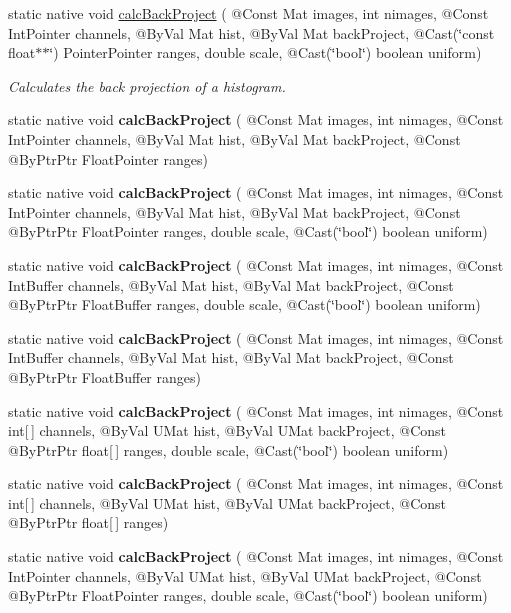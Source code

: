 \begin{DoxyCompactItemize}
\item 
static native void \hyperlink{group__imgproc__hist_gaf0312cafdf92e7baeb662d460281307e}{calc\+Back\+Project} ( @Const Mat images, int nimages, @Const Int\+Pointer channels, @By\+Val Mat hist, @By\+Val Mat back\+Project, @Cast(\char`\"{}const float$\ast$$\ast$\char`\"{}) Pointer\+Pointer ranges, double scale, @Cast(\char`\"{}bool\char`\"{}) boolean uniform)
\begin{DoxyCompactList}\small\item\em Calculates the back projection of a histogram. \end{DoxyCompactList}\item 
static native void {\bfseries calc\+Back\+Project} ( @Const Mat images, int nimages, @Const Int\+Pointer channels, @By\+Val Mat hist, @By\+Val Mat back\+Project, @Const @By\+Ptr\+Ptr Float\+Pointer ranges)
\item 
static native void {\bfseries calc\+Back\+Project} ( @Const Mat images, int nimages, @Const Int\+Pointer channels, @By\+Val Mat hist, @By\+Val Mat back\+Project, @Const @By\+Ptr\+Ptr Float\+Pointer ranges, double scale, @Cast(\char`\"{}bool\char`\"{}) boolean uniform)
\item 
static native void {\bfseries calc\+Back\+Project} ( @Const Mat images, int nimages, @Const Int\+Buffer channels, @By\+Val Mat hist, @By\+Val Mat back\+Project, @Const @By\+Ptr\+Ptr Float\+Buffer ranges, double scale, @Cast(\char`\"{}bool\char`\"{}) boolean uniform)
\item 
static native void {\bfseries calc\+Back\+Project} ( @Const Mat images, int nimages, @Const Int\+Buffer channels, @By\+Val Mat hist, @By\+Val Mat back\+Project, @Const @By\+Ptr\+Ptr Float\+Buffer ranges)
\item 
static native void {\bfseries calc\+Back\+Project} ( @Const Mat images, int nimages, @Const int\mbox{[}$\,$\mbox{]} channels, @By\+Val U\+Mat hist, @By\+Val U\+Mat back\+Project, @Const @By\+Ptr\+Ptr float\mbox{[}$\,$\mbox{]} ranges, double scale, @Cast(\char`\"{}bool\char`\"{}) boolean uniform)
\item 
static native void {\bfseries calc\+Back\+Project} ( @Const Mat images, int nimages, @Const int\mbox{[}$\,$\mbox{]} channels, @By\+Val U\+Mat hist, @By\+Val U\+Mat back\+Project, @Const @By\+Ptr\+Ptr float\mbox{[}$\,$\mbox{]} ranges)
\item 
static native void {\bfseries calc\+Back\+Project} ( @Const Mat images, int nimages, @Const Int\+Pointer channels, @By\+Val U\+Mat hist, @By\+Val U\+Mat back\+Project, @Const @By\+Ptr\+Ptr Float\+Pointer ranges, double scale, @Cast(\char`\"{}bool\char`\"{}) boolean uniform)
$$
\end{DoxyCompactItemize}
